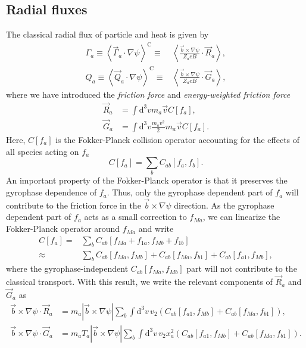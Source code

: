 \documentclass[12pt, a4paper]{article}
\renewcommand{\d}{\ensuremath{\mathrm{d}}}
\newcommand{\lang}{\left\langle}
\newcommand{\rang}{\right\rangle}
\begin{document}
\subsection{Radial fluxes}
The classical radial flux of particle and heat is given by
\begin{align}
  \Gamma_a \equiv \lang \vec{\Gamma}_a \cdot \nabla \psi \rang^{\text{C}} \equiv& \lang \frac{\vec{b} \times \nabla \psi}{Z_a e B} \cdot\vec{R}_a \rang,\label{eq:Gamma} \\
  Q_a \equiv \lang \vec{Q}_a \cdot \nabla \psi \rang^{\text{C}} \equiv& \lang \frac{\vec{b} \times \nabla \psi}{Z_a e B} \cdot\vec{G}_a \rang,\label{eq:Q}
\end{align}
where we have introduced the \emph{friction force} and \emph{energy-weighted friction force}
\begin{align}
  \vec{R}_a &= \int \d^3 v m_a \vec{v} C[f_{a}],\\
  \vec{G}_a &= \int \d^3 v \frac{m_a v^2}{2}  m_a \vec{v} C[f_{a}].
\end{align}
Here, $C[f_a]$ is the Fokker-Planck collision operator accounting for the effects of all species acting on $f_a$
\begin{equation}
    C[f_a] = \sum_b C_{ab}\left[f_{a},f_{b}\right].
    \end{equation}
    An important property of the Fokker-Planck operator is that it preserves the gyrophase dependence of $f_a$. Thus, only the gyrophase dependent part of $f_{a}$ will contribute to the friction force in the $\vec{b} \times \nabla\psi$ direction.
    As the gyrophase dependent part of $f_a$ acts as a small correction to $f_{Ma}$, we can linearize the Fokker-Planck operator around $f_{Ma}$ and write
\begin{equation}
  \begin{aligned}
    C[f_a] =& \sum_b C_{ab}\left[f_{Ma} + f_{1a},f_{Mb}+f_{1b}\right] \\
    \approx & \sum_b C_{ab}[f_{Ma},f_{Mb}] + C_{ab}[f_{Ma},f_{b1}] + C_{ab}[f_{a1},f_{Mb}],
      \end{aligned}
    \end{equation}
    where the gyrophase-independent $C_{ab}[f_{Ma},f_{Mb}]$ part will not contribute to the classical transport. With this result, we write the relevant components of $\vec{R}_a$ and $\vec{G}_a$ as
    \begin{align}
  \vec{b} \times \nabla \psi \cdot \vec{R}_a &= m_a  |\vec{b} \times \nabla \psi|\sum_b \int \!\d^3 v \, v_2 \left(C_{ab}[f_{a1},f_{Mb}] + C_{ab}[f_{Ma},f_{b1}]\right),\\
  \vec{b} \times \nabla \psi \cdot \vec{G}_a &= m_a T_a |\vec{b} \times \nabla \psi| \sum_b \int \!\d^3 v\, v_2 x_a^2  \left(C_{ab}[f_{a1},f_{Mb}] + C_{ab}[f_{Ma},f_{b1}] \right).
    \end{align}
\end{document}
